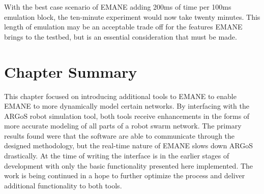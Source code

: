 With the best case scenario of EMANE adding 200ms of time per 100ms emulation block, the ten-minute experiment would now take twenty minutes.
This length of emulation may be an acceptable trade off for the features EMANE brings to the testbed, but is an essential consideration that must be made.

\section{Chapter Summary}
This chapter focused on introducing additional tools to EMANE to enable EMANE to more dynamically model certain networks.
By interfacing with the ARGoS robot simulation tool, both tools receive enhancements in the forms of more accurate modeling of all parts of a robot swarm network.
The primary results found were that the software are able to communicate through the designed methodology, but the real-time nature of EMANE slows down ARGoS drastically.
At the time of writing the interface is in the earlier stages of development with only the basic functionality presented here implemented.
The work is being continued in a hope to further optimize the process and deliver additional functionality to both tools.
